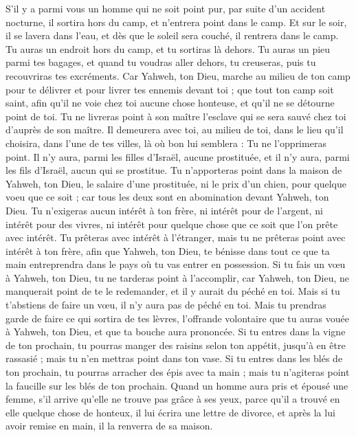 \begin{multicols}{2}
S'il y a parmi vous un homme qui ne soit point pur, par suite d’un accident nocturne, il sortira hors du camp, et n'entrera point dans le camp.
Et sur le soir, il se lavera dans l’eau, et dès que le soleil sera couché, il rentrera dans le camp.
Tu auras un endroit hors du camp, et tu sortiras là dehors.
Tu auras un pieu parmi tes bagages, et quand tu voudras aller dehors, tu creuseras, puis tu recouvriras tes excréments.
Car Yahweh, ton Dieu, marche au milieu de ton camp pour te délivrer et pour livrer tes ennemis devant toi ; que tout ton camp soit saint, afin qu'il ne voie chez toi aucune chose honteuse, et qu'il ne se détourne point de toi.
Tu ne livreras point à son maître l’esclave qui se sera sauvé chez toi d'auprès de son maître.
Il demeurera avec toi, au milieu de toi, dans le lieu qu'il choisira, dans l'une de tes villes, là où bon lui semblera : Tu ne l’opprimeras point.
Il n’y aura, parmi les filles d'Israël, aucune prostituée, et il n’y aura, parmi les fils d’Israël, aucun qui se prostitue.
Tu n'apporteras point dans la maison de Yahweh, ton Dieu, le salaire d'une prostituée, ni le prix d'un chien, pour quelque voeu que ce soit ; car tous les deux sont en abomination devant Yahweh, ton Dieu.
Tu n’exigeras aucun intérêt à ton frère, ni intérêt pour de l’argent, ni intérêt pour des vivres, ni intérêt pour quelque chose que ce soit que l'on prête avec intérêt.
Tu prêteras avec intérêt à l'étranger, mais tu ne prêteras point avec intérêt à ton frère, afin que Yahweh, ton Dieu, te bénisse dans tout ce que ta main entreprendra dans le pays où tu vas entrer en possession.
Si tu fais un vœu à Yahweh, ton Dieu, tu ne tarderas point à l'accomplir, car Yahweh, ton Dieu, ne manquerait point de te le redemander, et il y aurait du péché en toi.
Mais si tu t'abstiens de faire un vœu, il n'y aura pas de péché en toi.
Mais tu prendras garde de faire ce qui sortira de tes lèvres, l’offrande volontaire que tu auras vouée à Yahweh, ton Dieu, et que ta bouche aura prononcée.
Si tu entres dans la vigne de ton prochain, tu pourras manger des raisins selon ton appétit, jusqu'à en être rassasié ; mais tu n'en mettras point dans ton vase.
Si tu entres dans les blés de ton prochain, tu pourras arracher des épis avec ta main ; mais tu n’agiteras point la faucille sur les blés de ton prochain.
\VerseOne{}Quand un homme aura pris et épousé une femme, s'il arrive qu'elle ne trouve pas grâce à ses yeux, parce qu’il a trouvé en elle quelque chose de honteux, il lui écrira une lettre de divorce, et après la lui avoir remise en main, il la renverra de sa maison.

\end{multicols}
